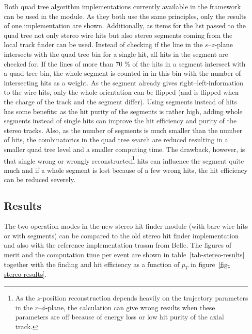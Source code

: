 Both quad tree algorithm implementations currently available in the framework can be used in the module. As they both use the same principles, only the results of one implementation are shown. Additionally, as items for the list passed to the quad tree not only stereo wire hits but also stereo segments coming from the local track finder can be used. Instead of checking if the line in the $s$--$z$-plane intersects with the quad tree bin for a single hit, all hits in the segment are checked for. If the lines of more than 70 \% of the hits in a segment intersect with a quad tree bin, the whole segment is counted in in this bin with the number of intersecting hits as a weight. As the segment already gives right--left-information to the wire hits, only the whole orientation can be flipped (and is flipped when the charge of the track and the segment differ). Using segments instead of hits has some benefits: as the hit purity of the segments is rather high, adding whole segments instead of single hits can improve the hit efficiency and purity of the stereo tracks. Also, as the number of segments is much smaller than the number of hits, the combinatorics in the quad tree search are reduced resulting in a smaller quad tree level and a smaller computing time. The drawback, however, is that single wrong or wrongly reconstructed\footnote{As the $z$-position reconstruction depends heavily on the trajectory parameters in the $r$--$\phi$-plane, the calculation can give wrong results when these parameters are off because of energy loss or low hit purity of the axial track.} hits can influence the segment quite much and if a whole segment is lost because of a few wrong hits, the hit efficiency can be reduced severely.

\subsection{Results}

The two operation modes in the new stereo hit finder module (with bare wire hits or with segments) can be compared to the old stereo hit finder implementation and also with the reference implementation trasan from Belle. The figures of merit and the computation time per event are shown in table~\ref{tab-stereo-results} together with the finding and hit efficiency as a function of $p_T$ in figure~\ref{fig-stereo-results}. 

